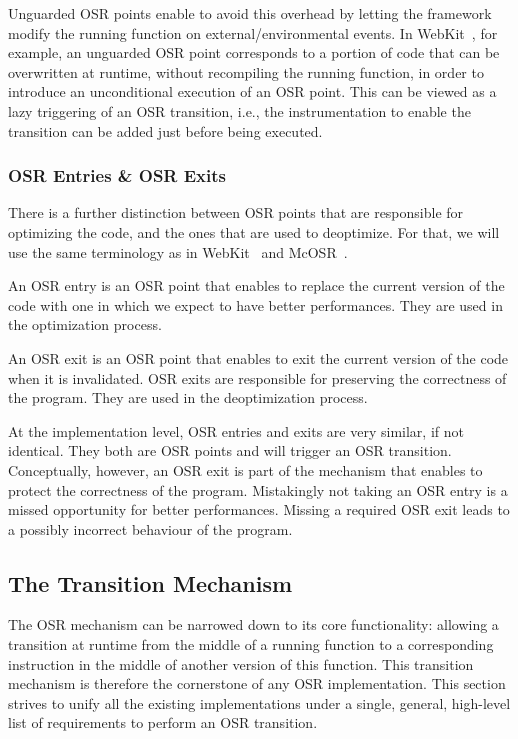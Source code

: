 Unguarded OSR points enable to avoid this overhead by letting the framework modify the running function on external/environmental events.
In WebKit~\cite{WebKitURL}, for example, an unguarded OSR point corresponds to a portion of code that can be overwritten at runtime, without recompiling the running function, in order to introduce an unconditional execution of an OSR point.
This can be viewed as a lazy triggering of an OSR transition, i.e., the instrumentation to enable the transition can be added just before being executed.\\

\subsubsection{OSR Entries \& OSR Exits}

There is a further distinction between OSR points that are responsible for optimizing the code, and the ones that are used to deoptimize.
For that, we will use the same terminology as in WebKit~\cite{WebKitURL} and McOSR~\cite{lameed2013modular}.

\begin{definition}\label{OSREntryDefinition}
An OSR entry is an OSR point that enables to replace the current version of the code with one in which we expect to have better performances.
They are used in the optimization process.
\end{definition}

\begin{definition}
An OSR exit is an OSR point that enables to exit the current version of the code when it is invalidated.
OSR exits are responsible for preserving the correctness of the program.
They are used in the deoptimization process.
\end{definition}

At the implementation level, OSR entries and exits are very similar, if not identical. 
They both are OSR points and will trigger an OSR transition.
Conceptually, however, an OSR exit is part of the mechanism that enables to protect the correctness of the program.
Mistakingly not taking an OSR entry is a missed opportunity for better performances.
Missing a required OSR exit leads to a possibly incorrect behaviour of the program.\\

\subsection{The Transition Mechanism}
The OSR mechanism can be narrowed down to its core functionality: allowing a transition at runtime from the middle of a running function to a corresponding instruction in the middle of another version of this function.
This transition mechanism is therefore the cornerstone of any OSR implementation.
This section strives to unify all the existing implementations under a single, general, high-level list of requirements to perform an OSR transition.\\

